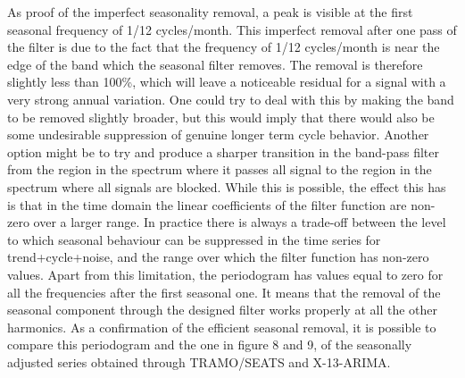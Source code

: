 \documentclass{article}
\begin{document}
As proof of the imperfect seasonality removal, a peak is visible at the first seasonal frequency of 1/12 cycles/month. This imperfect removal after one pass of the filter is due to the fact that the frequency of 1/12 cycles/month is near the edge of the band which the seasonal filter removes. The removal is therefore slightly less than 100\%, which will leave a noticeable residual for a signal with a very strong annual variation. One could try to deal with this by making the band to be removed slightly broader, but this would imply that there would also be some undesirable suppression of genuine longer term cycle behavior. Another option might be to try and produce a sharper transition in the band-pass filter from the region in the spectrum where it passes all signal to the region in the spectrum where all signals are blocked. While this is possible, the effect this has is that in the time domain the linear coefficients of the filter function are non-zero over a larger range. In practice there is always a trade-off between the level to which seasonal behaviour can be suppressed in the time series for trend+cycle+noise, and the range over which the filter function has non-zero values. Apart from this limitation, the periodogram has values equal to zero for all the frequencies after the first seasonal one. It means that the removal of the seasonal component through the designed filter works properly at all the other harmonics. As a confirmation of the efficient seasonal removal, it is possible to compare this periodogram and the one in figure 8 and 9, of the seasonally adjusted series obtained through TRAMO/SEATS and X-13-ARIMA.\\
\end{document}
